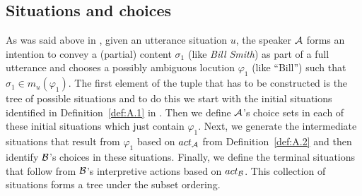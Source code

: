 
\subsection{Situations and choices}\label{sec:A.4.1}

As was said above in , given an utterance situation $u$, the speaker $\cal A$ forms  an intention to convey a (partial) content $\sigma_1$ (like \emph{Bill Smith}) as part of a full utterance and chooses a possibly ambiguous locution $\varphi_1$ (like ``Bill'') such that $\sigma_1 \in m_u(\varphi_1)$. The first element of the tuple that has to be constructed is the tree of possible situations and to do this we start with the initial situations identified in Definition~\ref{def:A.1} in . Then we define $\cal A$'s choice sets in each of these initial situations which just contain $\varphi_1$. Next, we generate the intermediate situations that result from $\varphi_1$ based on $act_{\cal A}$ from Definition~\ref{def:A.2} and then identify $\cal B$'s choices in these situations. Finally, we define the terminal situations that follow from $\cal B$'s interpretive  actions based on $act_{\cal B}$. This collection of situations forms a tree under the subset ordering.

